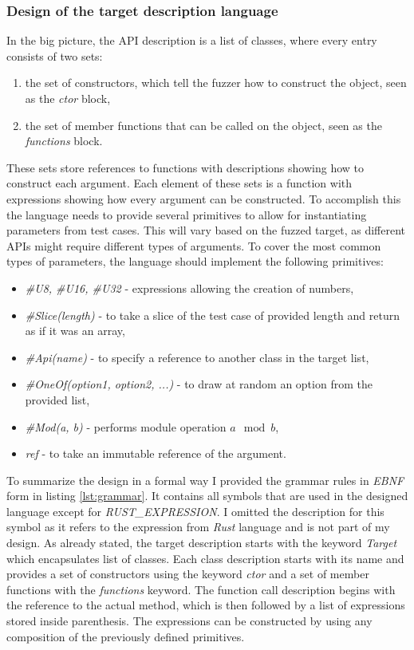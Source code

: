 \subsubsection{Design of the target description language} \label{sec:lang}
In the big picture, the API description is a list of classes, where every entry consists of two sets:
\begin{enumerate}
    \item the set of constructors, which tell the fuzzer how to construct the object, seen as the \textit{ctor} block,
    \item the set of member functions that can be called on the object, seen as the \textit{functions} block.
\end{enumerate}
These sets store references to functions with descriptions showing how to construct each argument. Each element of these sets is a function with expressions showing how every argument can be constructed. To accomplish this the language needs to provide several primitives to allow for instantiating parameters from test cases. This will vary based on the fuzzed target, as different APIs might require different types of arguments. To cover the most common types of parameters, the language should implement the following primitives:
\begin{itemize}
    \item \textit{\#U8, \#U16, \#U32} - expressions allowing the creation of numbers,
    \item \textit{\#Slice(length)} - to take a slice of the test case of provided length and return as if it was an array, 
    \item \textit{\#Api(name)} - to specify a reference to another class in the target list,
    \item \textit{\#OneOf(option1, option2, ...)} - to draw at random an option from the provided list,
    \item \textit{\#Mod(a, b)} - performs module operation $a \mod b$,
    \item \textit{ref } - to take an immutable reference of the argument.
\end{itemize}
To summarize the design in a formal way I provided the grammar rules in \textit{EBNF} form in listing \ref{lst:grammar}. It contains all symbols that are used in the designed language except for \textit{RUST\_EXPRESSION}. I omitted the description for this symbol as it refers to the expression from \textit{Rust} language and is not part of my design. As already stated, the target description starts with the keyword \textit{Target} which encapsulates list of classes. Each class description starts with its name and provides a set of constructors using the keyword \textit{ctor} and a set of member functions with the \textit{functions} keyword. The function call description begins with the reference to the actual method, which is then followed by a list of expressions stored inside parenthesis. The expressions can be constructed by using any composition of the previously defined primitives.

